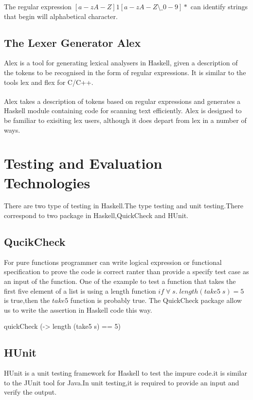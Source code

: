 The regular expression $ [a-zA-Z]{1}[a-zA-Z\setminus\_0-9]*  $ can identify strings that begin will alphabetical character.


\subsection{The Lexer Generator Alex}
Alex is a tool for generating lexical analysers in Haskell, given a description of the tokens to be recognised in the form of regular expressions. It is similar to the tools lex and flex for C/C++.
\\\\
Alex takes a description of tokens based on regular expressions and generates a Haskell module containing code for scanning text efficiently. Alex is designed to be familiar to exisiting lex users, although it does depart from lex in a number of ways.\cite{alex}

\section{Testing and Evaluation Technologies}
There are two type of testing in Haskell.The type testing and unit testing.There correspond to two package in Haskell,QuickCheck and HUnit.
\subsection*{QucikCheck}
For pure functions programmer can write logical expression or functional specification to prove the code is correct ranter than provide a specify test case as an input of the function.
One of the example to test a function that takes the first five element of a list is using a length function $ if \;\forall \;s.\; length(take5 \;s) = 5 \;$ is true,then the $take5$ function is probably true.
The QuickCheck package allow us to write the assertion in Haskell code this way.
\begin{hcode}
quickCheck (\s -> length (take5 s) == 5)
\end{hcode}

\subsection*{HUnit}
HUnit is a unit testing framework for Haskell to test the impure code.it is similar to the JUnit tool for Java.In unit testing,it is required to provide an input and verify the output.




